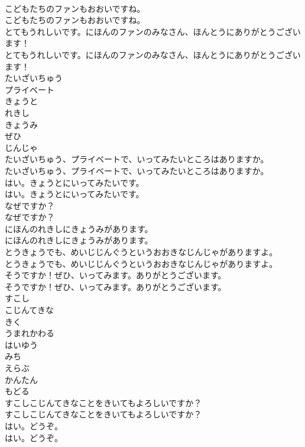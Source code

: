 \documentclass[8pt]{extreport}
\begin{document}
\begin{CJK}{UTF8}{min}
\\	こどもたちのファンもおおいですね。	
\\	こどもたちのファンもおおいですね。 
\\	とてもうれしいです。にほんのファンのみなさん、ほんとうにありがとうございます！	
\\	とてもうれしいです。にほんのファンのみなさん、ほんとうにありがとうございます！ 
\\	たいざいちゅう
\\	プライベート
\\	きょうと
\\	れきし
\\	きょうみ
\\	ぜひ
\\	じんじゃ
\\	たいざいちゅう、プライベートで、いってみたいところはありますか。	
\\	たいざいちゅう、プライベートで、いってみたいところはありますか。 
\\	はい。きょうとにいってみたいです。	
\\	はい。きょうとにいってみたいです。 
\\	なぜですか？	
\\	なぜですか？ 
\\	にほんのれきしにきょうみがあります。	
\\	にほんのれきしにきょうみがあります。 
\\	とうきょうでも、めいじじんぐうというおおきなじんじゃがありますよ。	
\\	とうきょうでも、めいじじんぐうというおおきなじんじゃがありますよ。 
\\	そうですか！ぜひ、いってみます。ありがとうございます。	
\\	そうですか！ぜひ、いってみます。ありがとうございます。 
\\	すこし
\\	こじんてきな
\\	きく
\\	うまれかわる
\\	はいゆう
\\	みち
\\	えらぶ
\\	かんたん
\\	もどる
\\	すこしこじんてきなことをきいてもよろしいですか？	
\\	すこしこじんてきなことをきいてもよろしいですか？ 
\\	はい。どうぞ。	
\\	はい。どうぞ。 

\end{CJK}
\end{document}
